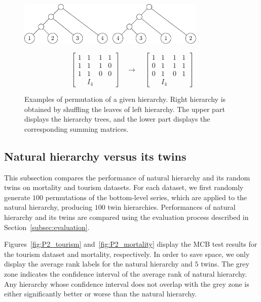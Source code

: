 \documentclass[a4paper,review,12pt,authoryear]{elsarticle}
\begin{document}
\begin{figure}
    \centering
    \includegraphics[width=0.8\textwidth]{figures/aggcluster_random.pdf}
    
    \[
    \begin{bmatrix}
    1 & 1 & 1 & 1\\
    1 & 1 & 1 & 0 \\
    1 & 1 & 0 & 0 \\
    & I_4 & & 
    \end{bmatrix}
    \quad
    \rightarrow
    \quad
    \begin{bmatrix}
    1 & 1 & 1 & 1\\
    0 & 1 & 1 & 1 \\
    0 & 1 & 0 & 1 \\
    & I_4 & & 
    \end{bmatrix}
    \]

\caption{\label{fig:aggcluster_random}Examples of permutation of a given hierarchy. Right hierarchy is obtained by shuffling the leaves of left hierarchy. The upper part displays the hierarchy trees, and the lower part displays the corresponding summing matrices.}
\end{figure}


\subsection{Natural hierarchy versus its twins}
\label{subsec:n_vs_pn}

This subsection compares the performance of natural hierarchy and its random twins on mortality and tourism datasets.
For each dataset, we first randomly generate $100$ permutations of the bottom-level series, which are applied to the natural hierarchy, producing $100$ twin hierarchies. Performances of natural hierarchy and its twins are compared using the evaluation process described in Section~\ref{subsec:evaluation}.

Figures~\ref{fig:P2_tourism} and~\ref{fig:P2_mortality} display the MCB test results for the tourism dataset and mortality, respectively. 
In order to save space, we only display the average rank labels for the natural hierarchy and $5$ twins. The grey zone indicates the confidence interval of the average rank of natural hierarchy. Any hierarchy whose confidence interval does not overlap with the grey zone is either significantly better or worse than the natural hierarchy. 
\end{document}
